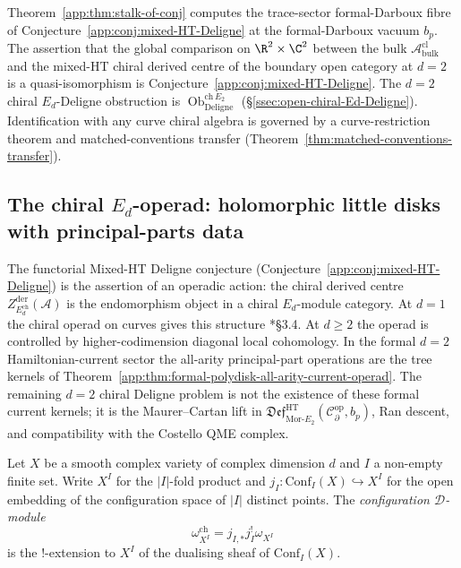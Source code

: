\begin{rmk}
Theorem~\ref{app:thm:stalk-of-conj} computes the trace-sector
formal-Darboux fibre of Conjecture~\ref{app:conj:mixed-HT-Deligne} at the
formal-Darboux vacuum $b_p$.  The assertion that the global comparison on
$\R^2\times\C^2$ between the bulk
$\mathcal A^{\mathrm{cl}}_{\mathrm{bulk}}$ and the mixed-HT chiral
derived centre of the boundary open category at $d=2$ is a
quasi-isomorphism is
Conjecture~\ref{app:conj:mixed-HT-Deligne}.  The \(d=2\)
chiral \(E_d\)-Deligne obstruction is
\(\operatorname{Ob}^{\mathrm{ch}\,E_2}_{\mathrm{Deligne}}\)
(\S\ref{ssec:open-chiral-Ed-Deligne}).  Identification
with any curve chiral algebra is governed by a curve-restriction theorem
and matched-conventions transfer
(Theorem~\ref{thm:matched-conventions-transfer}).
\end{rmk}

\subsection{The chiral \texorpdfstring{$E_d$}{Ed}-operad: holomorphic little disks with principal-parts data}\label{app:hfc:chiral-Ed-operad}

The functorial Mixed-HT Deligne conjecture
(Conjecture~\ref{app:conj:mixed-HT-Deligne}) is the assertion of an
operadic action: the chiral derived centre
$Z^{\mathrm{der}}_{E_d^{\mathrm{ch}}}(\mathcal A)$ is the endomorphism
object in a chiral $E_d$-module category.  At $d=1$ the chiral operad
on curves gives this structure
\cite{beilinson-drinfeld-chiral}*{\S 3.4}.  At $d\geq 2$ the operad
is controlled by higher-codimension diagonal local cohomology.  In the
formal \(d=2\) Hamiltonian-current sector the all-arity principal-part
operations are the tree kernels of
Theorem~\ref{app:thm:formal-polydisk-all-arity-current-operad}.  The
remaining \(d=2\) chiral Deligne problem is not the existence of these
formal current kernels; it is the Maurer--Cartan lift in
\(\mathfrak{Def}^{\mathrm{HT}}_{\mathrm{Mor}\mbox{-}E_2}
(\mathcal C^{\mathrm{op}}_\partial,b_p)\), Ran descent, and
compatibility with the Costello QME complex.

\begin{defn}\label{app:defn:conf-D-module}
Let $X$ be a smooth complex variety of complex dimension $d$ and $I$
a non-empty finite set.  Write $X^I$ for the $|I|$-fold product and
$j_I\colon\mathrm{Conf}_I(X)\hookrightarrow X^I$ for the open embedding
of the configuration space of $|I|$ distinct points.  The
\emph{configuration $\mathcal D$-module}
\[
  \omega^{\mathrm{ch}}_{X^I}=j_{I,*}j_I^!\omega_{X^I}
\]
is the $!$-extension to $X^I$ of the dualising sheaf of
$\mathrm{Conf}_I(X)$.
\end{defn}

